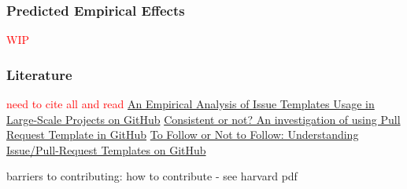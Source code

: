 \documentclass[source/paper/main.tex]{subfiles}
\begin{document}
\subsubsection{Predicted Empirical Effects}
\textcolor{red}{WIP}
\subsubsection{Literature} 
\textcolor{red}{need to cite all and read}
\hyperlink{https://dl.acm.org/doi/10.1145/3643673}{An Empirical Analysis of Issue Templates Usage in Large-Scale Projects on GitHub}
\hyperlink{https://doi.org/10.1016/j.infsof.2021.106797}{Consistent or not? An investigation of using Pull Request Template in GitHub}
\hyperlink{https://doi.org/10.1109/TSE.2022.3224053}{To Follow or Not to Follow: Understanding Issue/Pull-Request Templates on GitHub}


barriers to contributing: how to contribute - see harvard pdf 
\end{document}

